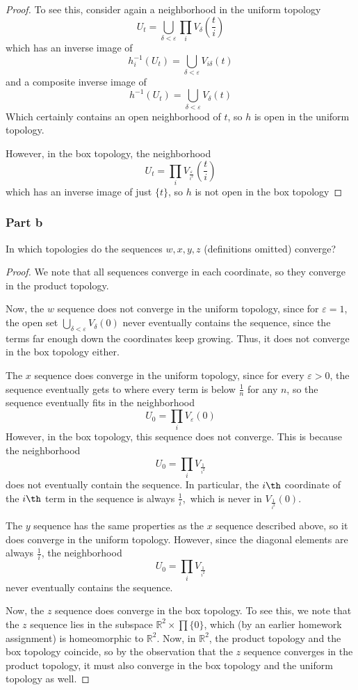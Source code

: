 \documentclass[fontsize=11pt]{scrartcl} %
\numberwithin{equation}{section} %
\numberwithin{figure}{section} %
\numberwithin{table}{section} %
\newcommand{\R}{\mathbb{R}}
\begin{document}
\begin{proof}
    To see this, consider again a neighborhood in the uniform topology
    \[
        U_t = \bigcup_{\delta<\varepsilon} \prod_i V_{\delta}(\frac{t}{i})
    \]
    which has an inverse image of
    \[
    h_i^{-1}(U_t) = \bigcup_{\delta<\varepsilon} V_{i\delta}(t)
    \]
    and a composite inverse image of
    \[
    h^{-1}(U_t) = \bigcup_{\delta<\varepsilon} V_{\delta}(t)
    \]
    Which certainly contains an open neighborhood of $t$, so $h$ is open
    in the uniform topology.

    However, in the box topology, the neighborhood
    \[
    U_t = \prod_i V_{\frac{\varepsilon}{i^2}}(\frac{t}{i})
    \]
    which has an inverse image of just $\{t\}$, so $h$ is not open in the box
    topology
\end{proof}

\subsubsection*{Part b}
In which topologies do the sequences $w,x,y,z$ (definitions omitted) converge?
\\
\begin{proof}
We note that all sequences converge in each coordinate, so they converge in the
product topology.

Now, the $w$ sequence does not converge in the uniform topology, since for
    $\varepsilon = 1$, the open set $\bigcup_{\delta<\varepsilon} V_{\delta}(0)$
    never eventually contains the sequence, since the terms far enough down the
    coordinates keep growing. Thus, it does not converge in the box topology
    either.

    The $x$ sequence does converge in the uniform topology, since for every
    $\varepsilon>0$, the sequence eventually gets to where every term is below
    $\frac{1}{n}$ for any $n$, so the sequence eventually fits in the
    neighborhood
    \[
    U_0 = \prod_i V_{\varepsilon}(0)
    \]
    However, in the box topology, this sequence does not converge. This is
    because the neighborhood
    \[
        U_0 = \prod_i V_{\frac{1}{i^2}}
    \]
    does not eventually contain the sequence. In particular, the $i\th$
    coordinate of the $i\th$ term in the sequence is always $\frac{1}{i}$,\
    which is never in $V_{\frac{1}{i^2}}(0)$.

    The $y$ sequence has the same properties as the $x$ sequence described
    above, so it does converge in the uniform topology. However, since the
    diagonal elements are always $\frac{1}{i}$, the neighborhood
    \[
        U_0 = \prod_i V_{\frac{1}{i^2}}
    \]
    never eventually contains the sequence.

    Now, the $z$ sequence does converge in the box topology.
    To see this, we note that the $z$ sequence lies in the subspace
    $\R^2\times\prod\{0\}$, which (by an earlier homework assignment) is
    homeomorphic to $\R^2$. Now, in $\R^2$, the product topology and the
    box topology coincide, so by the observation that the $z$ sequence converges
    in the product topology, it must also converge in the box topology and
    the uniform topology as well.
\end{proof}
\end{document}
